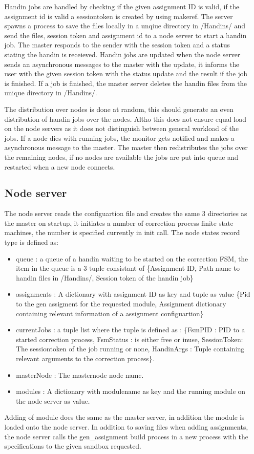Handin jobs are handled by checking if the given assignment ID is valid, if the assignment id is valid a sessiontoken is created by using makeref. The server spawns a process to save the files locally in a unqiue directory in /Handins/ and send the files, session token and assignment id to a node server to start a handin job. The master responds to the sender with the session token and a status stating the handin is receieved. Handin jobs are updated when the node server sends an asynchronous messages to the master with the update, it informs the user with the given session token with the status update and the result if the job is finished. If a job is finished, the master server deletes the handin files from the unique directory in /Handins/.

The distribution over nodes is done at random, this should generate an even distribution of handin jobs over the nodes. Altho this does not ensure equal load on the node servers as it does not distinguish between general workload of the jobs. If a node dies with running jobs, the monitor gets notified and makes a asynchronous message to the master. The master then redistributes the jobs over the remaining nodes, if no nodes are available the jobs are put into queue and restarted when a new node connects.
\subsection{Node server}
The node server reads the configuartion file and creates the same 3 directories as the master on startup, it initiates a number of correction process finite state machines, the number is specified currently in init call. The node states record type is defined as:
\begin{itemize}
     \item queue : a queue of a handin waiting to be started on the correction FSM, the item in the queue is a 3 tuple consistant of \{Assignment ID, Path name to handin files in /Handins/, Session token of the handin job\}
     \item assignments : A dictionary with assignment ID as key and tuple as value \{Pid to the gen assigment for the requested module, Assignment dictionary containing relevant information of a assignment configuartion\}
     \item currentJobs : a tuple list where the tuple is defined as : \{FsmPID : PID to a started correction process, FsmStatus : is either free or inuse, SessionToken: The sessiontoken of the job running or none, HandinArgs : Tuple containing relevant arguments to the correction process\}.
     \item masterNode : The masternode node name.
     \item modules : A dictionary with modulename as key and the running module on the node server as value.
 \end{itemize}
Adding of module does the same as the master server, in addition the module is loaded onto the node server. In addition to saving files when adding assignments, the node server calls the gen\_assignment build process in a new process with the specifications to the given sandbox requested.

